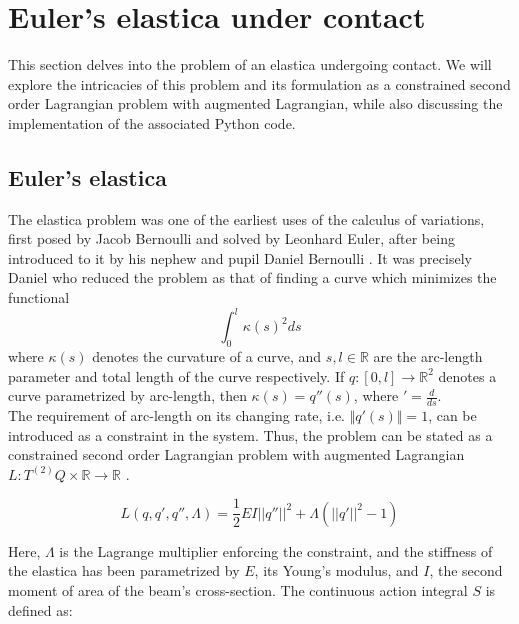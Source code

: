 
\section{Euler's elastica under contact}\label{sec:elastica}
%
This section delves into the problem of an elastica undergoing contact. We will explore the intricacies of this problem and its formulation as a constrained second order Lagrangian problem with augmented Lagrangian, while also discussing the implementation of the associated Python code.

\subsection{Euler's elastica}
The elastica problem was one of the earliest uses of the calculus of variations, first posed by Jacob Bernoulli and solved by Leonhard Euler, after being introduced to it by his nephew and pupil Daniel Bernoulli \cite{matsutani2010}. It was precisely Daniel who reduced the problem as that of finding a curve which minimizes the functional
\begin{equation*}
    \int_0^l \kappa(s)^2 ds
\end{equation*}
where $\kappa(s)$ denotes the curvature of a curve, and $s, l \in \mathbb{R}$ are the arc-length parameter and total length of the curve respectively. If $q: [0, l] \to \mathbb{R}^2$ denotes a curve parametrized by arc-length, then $\kappa(s) = q''(s)$, where $' = \frac{d}{d s}$.\\

The requirement of arc-length on its changing rate, i.e. $\Vert q'(s) \Vert = 1$, can be introduced as a constraint in the system. Thus, the problem can be stated as a constrained second order Lagrangian problem with augmented Lagrangian $L: T^{(2)}Q \times \mathbb{R} \rightarrow \mathbb{R}$ \cite{singer2008}.

\begin{equation}\label{eq:L_static_elastica}
    L \left( q, q', q'',\Lambda\right) = \frac{1}{2} EI ||q''||^2 + \Lambda (||q'||^2-1) 
\end{equation}

Here, $\Lambda$ is the Lagrange multiplier enforcing the constraint, and the stiffness of the elastica has been parametrized by $E$, its Young's modulus, and $I$, the second moment of area of the beam's cross-section. The continuous action integral $S$ is defined as:

